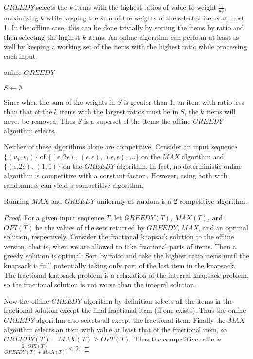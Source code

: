 $GREEDY$ selects the $k$ items with the highest ratios of value to weight $\frac{v_i}{w_i}$, maximizing $k$ while keeping the sum of the weights of the selected items at most 1. In the offline case, this can be done trivially by sorting the items by ratio and then selecting the highest $k$ items. An online algorithm can perform at least as well by keeping a working set of the items with the highest ratio while processing each input.

\begin{algorithm}
	\caption{online $GREEDY$}
	$S \leftarrow \emptyset$\;
\end{algorithm}

Since when the sum of the weights in $S$ is greater than 1, an item with ratio less than that of the $k$ items with the largest ratios must be in $S$, the $k$ items will never be removed. Thus $S$ is a superset of the items the offline $GREEDY$ algorithm selects.

Neither of these algorithms alone are competitive. Consider an input sequence $\{(w_i,v_i)\}$ of $\{(\epsilon,2\epsilon),\ (\epsilon,\epsilon),\ (\epsilon,\epsilon),\ \ldots\}$ on the $MAX$ algorithm and $\{(\epsilon, 2\epsilon),\ (1,1)\}$ on the $GREEDY$ algorithm. In fact, no deterministic online algorithm is competitive with a constant factor \cite{iwama}. However, using both with randomness can yield a competitive algorithm.

\begin{theorem}
	\emph{\cite{han}}
	Running $MAX$ and $GREEDY$ uniformly at random is a 2-competitive algorithm.
\end{theorem}
\begin{proof}
	For a given input sequence $T$, let $GREEDY(T)$, $MAX(T)$, and $OPT(T)$ be the values of the sets returned by $GREEDY$, $MAX$, and an optimal solution, respectively. Consider the fractional knapsack solution to the offline version, that is, when we are allowed to take fractional parts of items. Then a greedy solution is optimal: Sort by ratio and take the highest ratio items until the knapsack is full, potentially taking only part of the last item in the knapsack. The fractional knapsack problem is a relaxation of the integral knapsack problem, so the fractional solution is not worse than the integral solution.
	
	Now the offline $GREEDY$ algorithm by definition selects all the items in the fractional solution except the final fractional item (if one exists). Thus the online $GREEDY$ algorithm also selects all except the fractional item. Finally the $MAX$ algorithm selects an item with value at least that of the fractional item, so $GREEDY(T)+MAX(T) \ge OPT(T)$. Thus the competitive ratio is $\frac{2\cdot OPT(T)}{GREEDY(T)+MAX(T)} \le 2$.
\end{proof}

